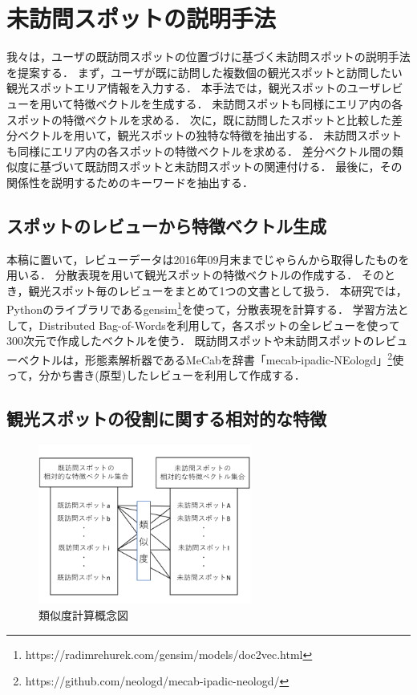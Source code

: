\documentclass{deimj}
\begin{document}
\section{未訪問スポットの説明手法}
\label{sec:未訪問スポットの説明手法}
我々は，ユーザの既訪問スポットの位置づけに基づく未訪問スポットの説明手法を提案する．
まず，ユーザが既に訪問した複数個の観光スポットと訪問したい観光スポットエリア情報を入力する．
本手法では，観光スポットのユーザレビューを用いて特徴ベクトルを生成する．
未訪問スポットも同様にエリア内の各スポットの特徴ベクトルを求める．
次に，既に訪問したスポットと比較した差分ベクトルを用いて，観光スポットの独特な特徴を抽出する．
未訪問スポットも同様にエリア内の各スポットの特徴ベクトルを求める．
差分ベクトル間の類似度に基づいて既訪問スポットと未訪問スポットの関連付ける．
最後に，その関係性を説明するためのキーワードを抽出する．

\subsection{スポットのレビューから特徴ベクトル生成}
\label{subsec:スポットのレビューから特徴ベクトル生成}
本稿に置いて，レビューデータは2016年09月末までじゃらんから取得したものを用いる．
分散表現\cite{Codd10}を用いて観光スポットの特徴ベクトルの作成する．
そのとき，観光スポット毎のレビューをまとめて1つの文書として扱う．
本研究では，Pythonのライブラリであるgensim\footnote{https://radimrehurek.com/gensim/models/doc2vec.html}を使って，分散表現を計算する．
学習方法として，Distributed Bag-of-Wordsを利用して，各スポットの全レビューを使って300次元で作成したベクトルを使う．
既訪問スポットや未訪問スポットのレビューベクトルは，形態素解析器であるMeCab\cite{Codd11}を辞書「mecab-ipadic-NEologd」\footnote{https://github.com/neologd/mecab-ipadic-neologd/}使って，分かち書き(原型)したレビューを利用して作成する．

\subsection{観光スポットの役割に関する相対的な特徴}
\label{subsec:観光スポットの役割に関する相対的な特徴}
\begin{figure}[t]
  \begin{center}
    \includegraphics[clip,width=7.0cm]{picture/Photo_CosSim_jap.png}
    \caption{類似度計算概念図}
    \label{fig:Photo_CosSim}
  \end{center}
\end{figure}
\end{document}
